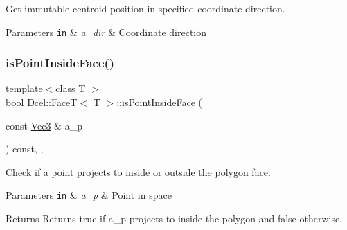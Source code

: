 Get immutable centroid position in specified coordinate direction. 


\begin{DoxyParams}[1]{Parameters}
\mbox{\tt in}  & {\em a\+\_\+dir} & Coordinate direction \\
\hline
\end{DoxyParams}
\mbox{\label{classDcel_1_1FaceT_a628d1734a63636a528fe2f7019bc4dd8}} 
\subsubsection{\texorpdfstring{is\+Point\+Inside\+Face()}{isPointInsideFace()}}
{\footnotesize\ttfamily template$<$class T $>$ \\
bool \hyperlink{classDcel_1_1FaceT}{Dcel\+::\+FaceT}$<$ T $>$\+::is\+Point\+Inside\+Face (\begin{DoxyParamCaption}\item[{const \hyperlink{classDcel_1_1FaceT_ade9c182834ec6f18a0e17b8140308db2}{Vec3} \&}]{a\+\_\+p }\end{DoxyParamCaption}) const\hspace{0.3cm}{\ttfamily [inline]}, {\ttfamily [protected]}, {\ttfamily [noexcept]}}



Check if a point projects to inside or outside the polygon face. 


\begin{DoxyParams}[1]{Parameters}
\mbox{\tt in}  & {\em a\+\_\+p} & Point in space \\
\hline
\end{DoxyParams}
\begin{DoxyReturn}{Returns}
Returns true if a\+\_\+p projects to inside the polygon and false otherwise. 
\end{DoxyReturn}
\mbox{\label{classDcel_1_1FaceT_af4116b8f72e0dfb797f79cd4f27a71e8}} 
